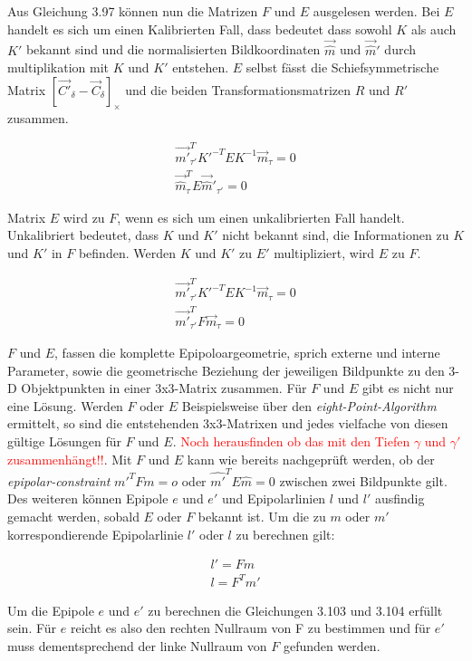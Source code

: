 Aus Gleichung 3.97 können nun die Matrizen $F$ und $E$ ausgelesen werden. Bei $E$ handelt es sich um einen Kalibrierten Fall, dass bedeutet dass sowohl $K$ als auch $K'$ bekannt sind und die normalisierten Bildkoordinaten $\vec{\hat{m}}$ und $\vec{\hat{m}}'$  durch multiplikation mit $K$ und $K'$ entstehen. $E$ selbst fässt die Schiefsymmetrische Matrix $[\vec{C'}_\delta - \vec{C}_\delta]_\times$ und die beiden Transformationsmatrizen $R$ und $R'$ zusammen. 

\begin{gather}
\vec{m'}_{\tau'}^T K'^{-T}EK^{-1}\vec{m}_\tau = 0\\
\vec{\hat{m}}_\tau^T E \vec{\hat{m}}'_{\tau'} = 0
\end{gather}

Matrix $E$ wird zu $F$, wenn es sich um einen unkalibrierten Fall handelt. Unkalibriert bedeutet, dass $K$ und $K'$ nicht bekannt sind, die Informationen zu $K$ und $K'$ in $F$ befinden. Werden $K$ und $K'$ zu $E'$ multipliziert, wird $E$ zu $F$. 

\begin{gather}
\vec{m'}_{\tau'}^T K'^{-T}EK^{-1}\vec{m}_\tau = 0\\
\vec{m'}_{\tau'}^T F\vec{m}_\tau = 0
\end{gather}

$F$ und $E$, fassen die komplette Epipoloargeometrie, sprich externe und interne Parameter, sowie die geometrische Beziehung der jeweiligen Bildpunkte zu den 3-D Objektpunkten in einer 3x3-Matrix zusammen. Für $F$ und $E$ gibt es nicht nur eine Lösung. Werden $F$ oder $E$ Beispielsweise über den \textit{eight-Point-Algorithm} ermittelt, so sind die entstehenden 3x3-Matrixen und jedes vielfache von diesen gültige Lösungen für $F$ und $E$\cite{HZ,HZ8}. \textcolor{red}{Noch herausfinden ob das mit den Tiefen $\gamma$ und $\gamma'$ zusammenhängt!!}. Mit $F$ und $E$ kann wie bereits nachgeprüft werden, ob der \textit{epipolar-constraint} $m'^TFm = o$ oder $\hat{m'}^TE\hat{m} = 0$ zwischen zwei Bildpunkte gilt. Des weiteren können Epipole $e$ und $e'$ und Epipolarlinien $l$ und $l'$ ausfindig gemacht werden, sobald $E$ oder $F$ bekannt ist\cite{HZ,Elements,HZ8,ZZGXr}. Um die zu $m$ oder $m'$ korrespondierende Epipolarlinie $l'$ oder $l$ zu berechnen gilt:

\begin{gather}
l' = Fm\\
l = F^Tm'
\end{gather} 

Um die Epipole $e$ und $e'$ zu berechnen die Gleichungen 3.103 und 3.104 erfüllt sein. Für $e$ reicht es also den rechten Nullraum von F zu bestimmen und für $e'$ muss dementsprechend der linke Nullraum von $F$ gefunden werden. 

